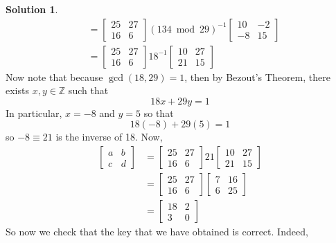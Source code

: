 \documentclass[11pt]{article}
\theoremstyle{definition}\newtheorem{definition}{Definition}
\theoremstyle{definition}\newtheorem{question}{Question}
\theoremstyle{definition}\newtheorem*{solution}{Solution}
\theoremstyle{definition}\newtheorem{example}{Example}
\theoremstyle{definition}\newtheorem{notation}{Notation}
\theoremstyle{theorem}\newtheorem{theorem}{Theorem}
\theoremstyle{theorem}\newtheorem{corollary}{Corollary}
\theoremstyle{theorem}\newtheorem{lemma}{Lemma}
\theoremstyle{theorem}\newtheorem{proposition}{Proposition}
\newcommand{\Z}{\mathbb{Z}}
\begin{document}
\begin{solution}
\begin{align*}
        &= \begin{bmatrix} 25 & 27 \\ 16 & 6 \end{bmatrix} (134 \bmod 29)^{-1} \begin{bmatrix} 10 & -2 \\ -8 & 15 \end{bmatrix} \\
        &= \begin{bmatrix} 25 & 27 \\ 16 & 6 \end{bmatrix} 18^{-1} \begin{bmatrix} 10 & 27 \\ 21 & 15 \end{bmatrix}
    \end{align*}
    Now note that because $\gcd(18, 29) = 1$, then by Bezout's Theorem, there exists $x, y \in \Z$ such that
    \begin{equation*}
        18x + 29y = 1
    \end{equation*}
    In particular, $x = -8$ and $y = 5$ so that
    \begin{equation*}
        18(-8) + 29(5) = 1
    \end{equation*}
    so $-8 \equiv 21$ is the inverse of 18. Now,
    \begin{align*}
        \begin{bmatrix} a & b \\ c & d \end{bmatrix} &= \begin{bmatrix} 25 & 27 \\ 16 & 6 \end{bmatrix} 21 \begin{bmatrix} 10 & 27 \\ 21 & 15 \end{bmatrix} \\
        &= \begin{bmatrix} 25 & 27 \\ 16 & 6 \end{bmatrix} \begin{bmatrix} 7 & 16 \\ 6 & 25 \end{bmatrix} \\
        &= \begin{bmatrix} 18 & 2 \\ 3 & 0 \end{bmatrix}
    \end{align*}
    So now we check that the key that we have obtained is correct. Indeed,

\end{solution}
\end{document}
